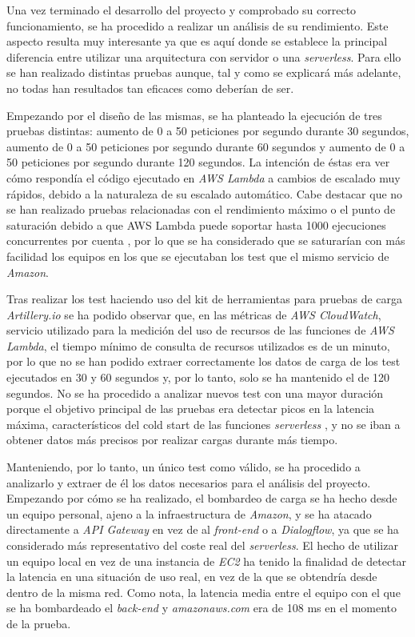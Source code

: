 \documentclass[11pt,spanish,listoffigures]{tfgetsinf}
\begin{document}
Una vez terminado el desarrollo del proyecto y comprobado su correcto funcionamiento, se ha procedido a realizar un análisis de su rendimiento. Este aspecto resulta muy interesante ya que es aquí donde se establece la principal diferencia entre utilizar una arquitectura con servidor o una \textit{serverless}. Para ello se han realizado distintas pruebas aunque, tal y como se explicará más adelante, no todas han resultados tan eficaces como deberían de ser.

Empezando por el diseño de las mismas, se ha planteado la ejecución de tres pruebas distintas: aumento de 0 a 50 peticiones por segundo durante 30 segundos, aumento de 0 a 50 peticiones por segundo durante 60 segundos y aumento de 0 a 50 peticiones por segundo durante 120 segundos. La intención de éstas era ver cómo respondía el código ejecutado en \textit{AWS Lambda} a cambios de escalado muy rápidos, debido a la naturaleza de su escalado automático. Cabe destacar que no se han realizado pruebas relacionadas con el rendimiento máximo o el punto de saturación debido a que AWS Lambda puede soportar hasta 1000 ejecuciones concurrentes por cuenta \cite{lambda-threads}, por lo que se ha considerado que se saturarían con más facilidad los equipos en los que se ejecutaban los test que el mismo servicio de \textit{Amazon}. 

Tras realizar los test haciendo uso del kit de herramientas para pruebas de carga \textit{Artillery.io} se ha podido observar que, en las métricas de \textit{AWS CloudWatch}, servicio utilizado para la medición del uso de recursos de las funciones de \textit{AWS Lambda}, el tiempo mínimo de consulta de recursos utilizados es de un minuto, por lo que no se han podido extraer correctamente los datos de carga de los test ejecutados en 30 y 60 segundos y, por lo tanto, solo se ha mantenido el de 120 segundos. No se ha procedido a analizar nuevos test con una mayor duración porque el objetivo principal de las pruebas era detectar picos en la latencia máxima, característicos del cold start de las funciones \textit{serverless} \cite{cold-start}, y no se iban a obtener datos más precisos por realizar cargas durante más tiempo.

Manteniendo, por lo tanto, un único test como válido, se ha procedido a analizarlo y extraer de él los datos necesarios para el análisis del proyecto. Empezando por cómo se ha realizado, el bombardeo de carga se ha hecho desde un equipo personal, ajeno a la infraestructura de \textit{Amazon}, y se ha atacado directamente a \textit{API Gateway} en vez de al \textit{front-end} o a \textit{Dialogflow}, ya que se ha considerado más representativo del coste real del \textit{serverless}. El hecho de utilizar un equipo local en vez de una instancia de \textit{EC2} ha tenido la finalidad de detectar la latencia en una situación de uso real, en vez de la que se obtendría desde dentro de la misma red. Como nota, la latencia media entre el equipo con el que se ha bombardeado el \textit{back-end} y \textit{amazonaws.com} era de 108 ms en el momento de la prueba.
\end{document}
